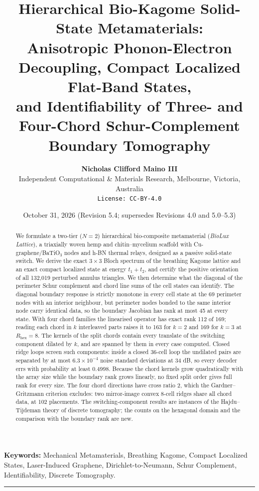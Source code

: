 \documentclass[11pt,a4paper]{article}
\title{\textbf{Hierarchical Bio-Kagome Solid-State Metamaterials:\\
Anisotropic Phonon-Electron Decoupling, Compact Localized Flat-Band States,\\
and Identifiability of Three- and Four-Chord Schur-Complement Boundary Tomography}}
\author{\textbf{Nicholas Clifford Maino III}\\
Independent Computational \& Materials Research, Melbourne, Victoria, Australia\\
\texttt{License: CC-BY-4.0}}
\date{October 31, 2026 (Revision 5.4; supersedes Revisions 4.0 and 5.0--5.3)}
\theoremstyle{definition}
\theoremstyle{remark}
\begin{document}
\maketitle

\begin{abstract}
\noindent We formulate a two-tier ($N=2$) hierarchical bio-composite metamaterial (\textit{BioLux Lattice}), a triaxially woven hemp and chitin--mycelium scaffold with Cu-graphene/BaTiO$_3$ nodes and h-BN thermal relays, designed as a passive solid-state switch. We derive the exact $3\times3$ Bloch spectrum of the breathing Kagome lattice and an exact compact localized state at energy $t_1+t_2$, and certify the positive orientation of all 132{,}019 perturbed annulus triangles. We then determine what the diagonal of the perimeter Schur complement and chord line sums of the cell states can identify. The diagonal boundary response is strictly monotone in every cell state at the 69 perimeter nodes with an interior neighbour, but perimeter nodes bonded to the same interior node carry identical data, so the boundary Jacobian has rank at most 45 at every state. With four chord families the linearised operator has exact rank 112 of 169; reading each chord in $k$ interleaved parts raises it to 163 for $k=2$ and 169 for $k=3$ at $R_{\text{hex}} = 8$. The kernels of the split chords contain every translate of the switching component dilated by $k$, and are spanned by them in every case computed. Closed ridge loops screen such components: inside a closed 36-cell loop the undilated pairs are separated by at most $6.3\times10^{-4}$ noise standard deviations at 34 dB, so every decoder errs with probability at least 0.4998. Because the chord kernels grow quadratically with the array size while the boundary rank grows linearly, no fixed split order gives full rank for every size. The four chord directions have cross ratio 2, which the Gardner--Gritzmann criterion excludes: two mirror-image convex 8-cell ridges share all chord data, at 102 placements. The switching-component results are instances of the Hajdu--Tijdeman theory of discrete tomography; the counts on the hexagonal domain and the comparison with the boundary rank are new.
\end{abstract}

\noindent \textbf{Keywords:} Mechanical Metamaterials, Breathing Kagome, Compact Localized States, Laser-Induced Graphene, Dirichlet-to-Neumann, Schur Complement, Identifiability, Discrete Tomography.

\vspace{0.5em}\hrule\vspace{0.5em}
\end{document}
